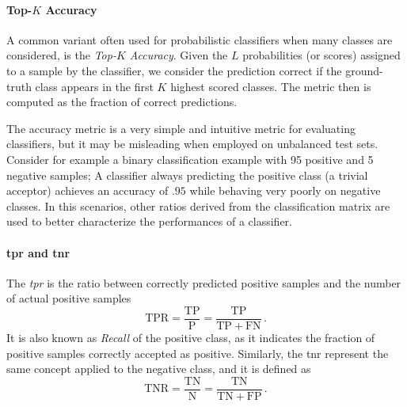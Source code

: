 \paragraph{Top-$K$ Accuracy}
A common variant often used for probabilistic classifiers when many classes are considered, is the \emph{Top-$K$ Accuracy}.
Given the $L$ probabilities (or scores) assigned to a sample by the classifier, we consider the prediction correct if the ground-truth class appears in the first $K$ highest scored classes.
The metric then is computed as the fraction of correct predictions.

The accuracy metric is a very simple and intuitive metric for evaluating classifiers, but it may be misleading when employed on unbalanced test sets.
Consider for example a binary classification example with 95 positive and 5 negative samples;
A classifier always predicting the positive class (a trivial acceptor) achieves an accuracy of $.95$ while behaving very poorly on negative classes.
In this scenarios, other ratios derived from the classification matrix are used to better characterize the performances of a classifier.

\paragraph{\acrshort{tpr} and \acrshort{tnr}}
The \emph{\gls{tpr}} is the ratio between correctly predicted positive samples and the number of actual positive samples
\begin{equation} \label{eq:back:tpr}
    \mathrm{TPR} = \frac{\mathrm{TP}}{\mathrm{P}} = \frac{\mathrm{TP}}{\mathrm{TP} + \mathrm{FN}} \,.
\end{equation}
It is also known as \emph{Recall} of the positive class, as it indicates the fraction of positive samples correctly accepted as positive.
Similarly, the \gls{tnr} represent the same concept applied to the negative class, and it is defined as
\begin{equation} \label{eq:back:tnr}
    \mathrm{TNR} = \frac{\mathrm{TN}}{\mathrm{N}} = \frac{\mathrm{TN}}{\mathrm{TN} + \mathrm{FP}} \,.
\end{equation}

